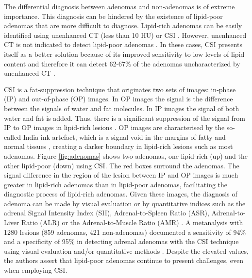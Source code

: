 \documentclass[11pt]{article}
\begin{document}
The differential diagnosis between adenomas and non-adenomas is
of extreme importance. This diagnosis can be hindered by the existence of
lipid-poor adenomas that are more difficult to diagnose. Lipid-rich adenomas can
be easily identified using unenhanced CT (less than 10 HU) \cite{Panda2015} or CSI
\cite{Platzek2019}. However, unenhanced CT is not indicated to detect lipid-poor
adenomas \cite{Israel2004}. In these cases, CSI presents itself as a better
solution because of its improved sensitivity to low levels of lipid content and
therefore it can detect 62-67\% of the adenomas uncharacterized by unenhanced CT
\cite{Israel2004}.

CSI is a fat-suppression technique that originates two sets of images: in-phase
(IP) and out-of-phase (OP) images. In OP images the signal is the difference
between the signals of water and fat molecules. In IP images the signal of both
water and fat is added. Thus, there is a significant suppression of the signal
from IP to OP images in lipid-rich lesions \cite{Jahanvi2021}. OP images are
characterised by the so-called India ink artefact, which is a signal void in the
margins of fatty and normal tissues \cite{Jahanvi2021}, creating a darker
boundary in lipid-rich lesions such as most adenomas. Figure \ref{fig:adenomas}
shows two adenomas, one lipid-rich (up) and the other lipid-poor (down) using
CSI. The red boxes surround the adenomas. The
signal difference in the region of the lesion between IP and OP images is much greater in lipid-rich
adenomas than in lipid-poor adenomas, facilitating the diagnostic process of
lipid-rich adenomas. Given these images, the diagnosis of
adenoma can be made by visual evaluation or by quantitative indices such as the
adrenal Signal Intensity Index (SII), Adrenal-to-Spleen Ratio (ASR),
Adrenal-to-Liver Ratio (ALR) or the Adrenal-to-Muscle Ratio (AMR)
\cite{Fujiyoshi2003}. A metanalysis with 1280
lesions (859 adenomas, 421 non-adenomas) documented a sensitivity of 94\% and
a specificity of 95\% in detecting adrenal adenomas with the CSI technique using
visual evaluation and/or quantitative methods \cite{Platzek2019}. Despite the
elevated values, the authors assert that lipid-poor adenomas continue to present
challenges, even when employing CSI.
\end{document}
